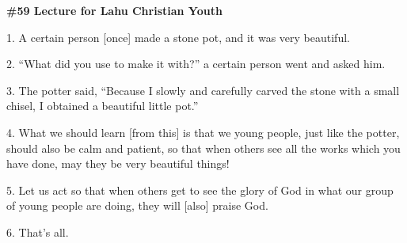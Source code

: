 
\textbf{\#59 Lecture for Lahu Christian Youth}

1. A certain person [once] made a stone pot, and it was very beautiful.

2. ``What did you use to make it with?'' a certain person went and asked him.

3. The potter said, ``Because I slowly and carefully carved the stone with a small
chisel, I obtained a beautiful little pot.''

4. What we should learn [from this] is that we young people, just like the potter,
should also be calm and patient, so that when others see all the works which you
have done, may they be very beautiful things!

5. Let us act so that when others get to see the glory of God in what our group
of young people are doing, they will [also] praise God.

6. That's all.


